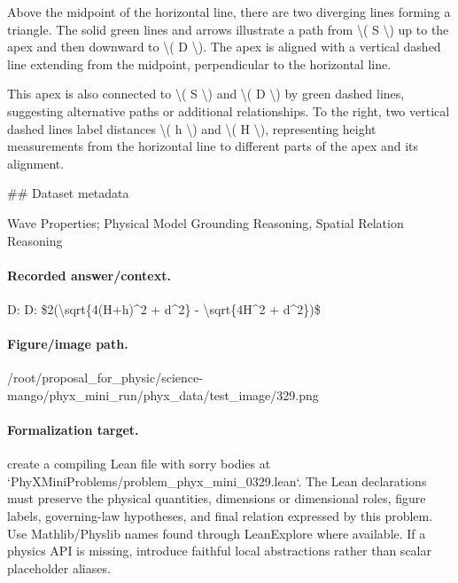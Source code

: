 Above the midpoint of the horizontal line, there are two diverging lines forming a triangle. The solid green lines and arrows illustrate a path from \textbackslash{}( S \textbackslash{}) up to the apex and then downward to \textbackslash{}( D \textbackslash{}). The apex is aligned with a vertical dashed line extending from the midpoint, perpendicular to the horizontal line.

This apex is also connected to \textbackslash{}( S \textbackslash{}) and \textbackslash{}( D \textbackslash{}) by green dashed lines, suggesting alternative paths or additional relationships. To the right, two vertical dashed lines label distances \textbackslash{}( h \textbackslash{}) and \textbackslash{}( H \textbackslash{}), representing height measurements from the horizontal line to different parts of the apex and its alignment.

\#\# Dataset metadata

Wave Properties; Physical Model Grounding Reasoning, Spatial Relation Reasoning

\paragraph{Recorded answer/context.}
D: D: \$2(\textbackslash{}sqrt\{4(H+h)\textasciicircum{}2 + d\textasciicircum{}2\} - \textbackslash{}sqrt\{4H\textasciicircum{}2 + d\textasciicircum{}2\})\$

\paragraph{Figure/image path.}
/root/proposal\_for\_physic/science-mango/phyx\_mini\_run/phyx\_data/test\_image/329.png

\paragraph{Formalization target.}
create a compiling Lean file with sorry bodies at `PhyXMiniProblems/problem\_phyx\_mini\_0329.lean`. The Lean declarations must preserve the physical quantities, dimensions or dimensional roles, figure labels, governing-law hypotheses, and final relation expressed by this problem.
Use Mathlib/Physlib names found through LeanExplore where available. If a physics API is missing, introduce faithful local abstractions rather than scalar placeholder aliases.

